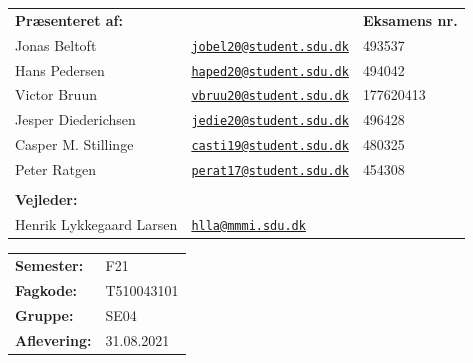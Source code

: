 \begin{titlepage}
\begin{center}
        \begin{table}[H]
            \centering
            \begin{tabular}{lll}
            \textbf{Præsenteret af:}    &\qquad\qquad\qquad &
            \textbf{Eksamens nr.}\\
                        Jonas Beltoft & \href{jobel20@student.sdu.dk}{\texttt{jobel20@student.sdu.dk}}  %
                &   493537\\ %
                Hans Pedersen            & 
                \href{haped20@student.sdu.dk}{\texttt{haped20@student.sdu.dk}}  
                   & 494042\\
                Victor Bruun            & \href{mailto:vbruu20@student.sdu.dk}{\texttt{vbruu20@student.sdu.dk}}  
                   & 177620413\\
                Jesper Diederichsen     & \href{mailto:jedie20@student.sdu.dk}{\texttt{jedie20@student.sdu.dk}}  
                   & 496428\\
                Casper M. Stillinge     & \href{mailto:casti19@student.sdu.dk}{\texttt{casti19@student.sdu.dk}}  
                    & 480325 \\
                Peter Ratgen             & \href{mailto:perat17@student.sdu.dk}{\texttt{perat17@student.sdu.dk}}  
                   & 454308  \\
                \vspace{1mm}\\ %
                \textbf{Vejleder:}      & \qquad\qquad\qquad & \\
                Henrik Lykkegaard Larsen       & 
                \href{mailto:hlla@mmmi.sdu.dk}{\texttt{hlla@mmmi.sdu.dk}}                 & \\
            \end{tabular}
        \end{table}
        
        \vfill
        \begin{table}[h!]
            \centering
            \begin{tabular}{ll}
            \textbf{Semester:} &F21\\
            \textbf{Fagkode:} &T510043101\\
            \textbf{Gruppe:} &SE04\\
            \textbf{Aflevering:} &31.08.2021\\
            \end{tabular}
        \end{table}
        
    \end{center}
\end{titlepage}
\clearpage